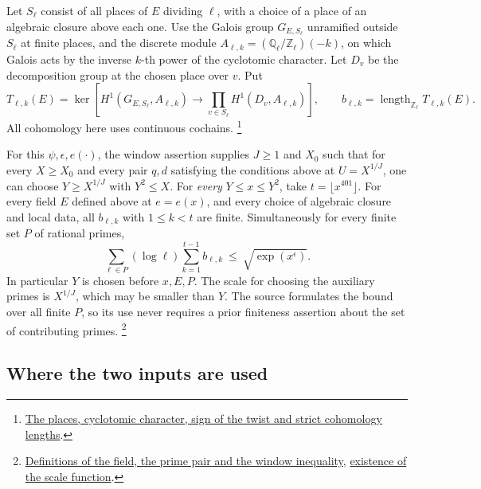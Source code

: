 Let \(S_\ell\) consist of all places of \(E\) dividing \(\ell\),
with a choice of a place of an algebraic closure above each one.
Use the Galois group \(G_{E,S_\ell}\) unramified outside \(S_\ell\)
at finite places, and the discrete module
\(A_{\ell,k}=(\mathbb Q_\ell/\mathbb Z_\ell)(-k)\), on which Galois
acts by the inverse \(k\)-th power of the cyclotomic character.
Let \(D_v\) be the decomposition group at the chosen place over \(v\).
Put
\[
   T_{\ell,k}(E)=\ker\!\left[
      H^1(G_{E,S_\ell},A_{\ell,k})\longrightarrow
           \prod_{v\in S_\ell}H^1(D_v,A_{\ell,k})\right],
   \qquad b_{\ell,k}=\operatorname{length}_{\mathbb Z_\ell} T_{\ell,k}(E).
\]
All cohomology here uses continuous cochains.
\footnote{\href{https://github.com/Deicyde/riemann-hypothesis/blob/40e56bab/src/Formalism/GaloisCohomology/Statement.lean\#L48-L78}{The places, cyclotomic character, sign of the twist and strict cohomology lengths}.}

For this \(\psi,\epsilon,e(\cdot)\), the window assertion supplies
\(J\ge1\) and \(X_0\) such that for every \(X\ge X_0\) and every
pair \(q,d\) satisfying the conditions above at \(U=X^{1/J}\),
one can choose \(Y\ge X^{1/J}\) with \(Y^2\le X\). For \emph{every}
\(Y\le x\le Y^2\), take \(t=\lfloor x^{401}\rfloor\). For every field
\(E\) defined above at \(e=e(x)\), and every choice of algebraic closure
and local data, all \(b_{\ell,k}\) with \(1\le k<t\) are finite.
Simultaneously for every finite set \(P\) of rational primes,
\begin{equation}\label{eq:entry-strict-length}
      \sum_{\ell\in P}(\log\ell)\sum_{k=1}^{t-1}b_{\ell,k}
                 \ \le\ \sqrt{\exp(x^\epsilon)} .
\end{equation}
In particular \(Y\) is chosen before \(x,E,P\). The scale for
choosing the auxiliary primes is \(X^{1/J}\), which may be smaller
than \(Y\). The source formulates the bound over all finite \(P\),
so its use never requires a prior finiteness assertion about the set
of contributing primes.
\footnote{\href{https://github.com/Deicyde/riemann-hypothesis/blob/40e56bab/src/Development/AutomorphicArithmetic/CharacterBoxes/ExistsPageN.lean\#L12-L49}{Definitions of the field, the prime pair and the window inequality},
\href{https://github.com/Deicyde/riemann-hypothesis/blob/40e56bab/src/Development/AutomorphicArithmetic/CharacterBoxes/ExistsPageN.lean\#L67-L77}{existence of the scale function}.}

\subsection{Where the two inputs are used}

